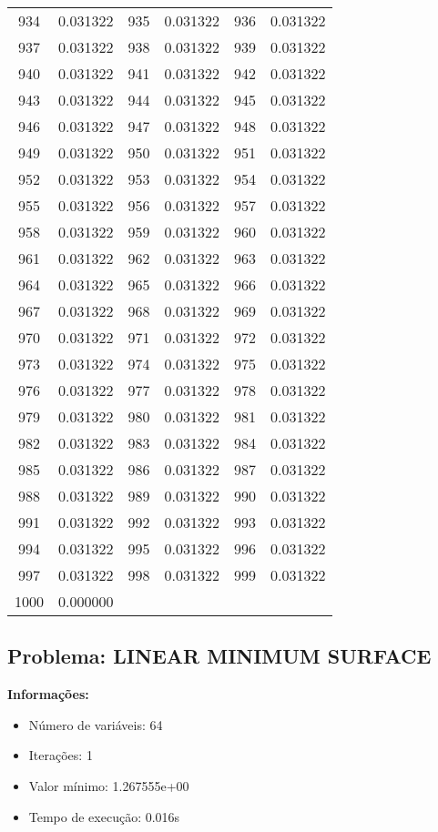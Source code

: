 \documentclass[12pt]{article}
\begin{document}
\begin{longtable}{@{}cc|cc|cc@{}}
934 & 0.031322 & 935 & 0.031322 & 936 & 0.031322 \\
937 & 0.031322 & 938 & 0.031322 & 939 & 0.031322 \\
940 & 0.031322 & 941 & 0.031322 & 942 & 0.031322 \\
943 & 0.031322 & 944 & 0.031322 & 945 & 0.031322 \\
946 & 0.031322 & 947 & 0.031322 & 948 & 0.031322 \\
949 & 0.031322 & 950 & 0.031322 & 951 & 0.031322 \\
952 & 0.031322 & 953 & 0.031322 & 954 & 0.031322 \\
955 & 0.031322 & 956 & 0.031322 & 957 & 0.031322 \\
958 & 0.031322 & 959 & 0.031322 & 960 & 0.031322 \\
961 & 0.031322 & 962 & 0.031322 & 963 & 0.031322 \\
964 & 0.031322 & 965 & 0.031322 & 966 & 0.031322 \\
967 & 0.031322 & 968 & 0.031322 & 969 & 0.031322 \\
970 & 0.031322 & 971 & 0.031322 & 972 & 0.031322 \\
973 & 0.031322 & 974 & 0.031322 & 975 & 0.031322 \\
976 & 0.031322 & 977 & 0.031322 & 978 & 0.031322 \\
979 & 0.031322 & 980 & 0.031322 & 981 & 0.031322 \\
982 & 0.031322 & 983 & 0.031322 & 984 & 0.031322 \\
985 & 0.031322 & 986 & 0.031322 & 987 & 0.031322 \\
988 & 0.031322 & 989 & 0.031322 & 990 & 0.031322 \\
991 & 0.031322 & 992 & 0.031322 & 993 & 0.031322 \\
994 & 0.031322 & 995 & 0.031322 & 996 & 0.031322 \\
997 & 0.031322 & 998 & 0.031322 & 999 & 0.031322 \\
1000 & 0.000000 &  &  &  &  \\

\end{longtable}


\newpage            
\subsection{Problema: LINEAR MINIMUM SURFACE}

\textbf{Informações:}
\begin{itemize}
\item Número de variáveis: 64
\item Iterações: 1
\item Valor mínimo: 1.267555e+00
\item Tempo de execução: 0.016s
\end{itemize}
\end{document}
